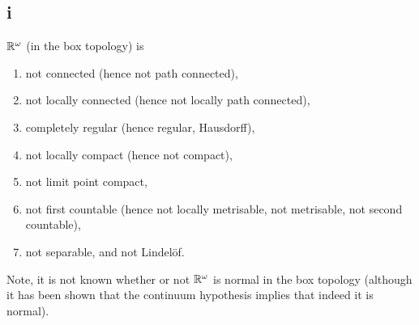
\subsection*{i}
  $\mathbb{R}^\omega$ (in the box topology) is
  \begin{enumerate}
  \item not connected (hence not path connected),
  \item not locally connected (hence not locally path connected),
  \item completely regular (hence regular, Hausdorff),
  \item not locally compact (hence not compact),
  \item not limit point compact,
  \item not first countable (hence not locally metrisable, not metrisable, not second countable),
  \item not separable, and not Lindel\"of.
  \end{enumerate}
Note, it is not known whether or not $\mathbb{R}^\omega$ is normal in the box topology (although it has been shown that the continuum hypothesis implies that indeed it is normal).

